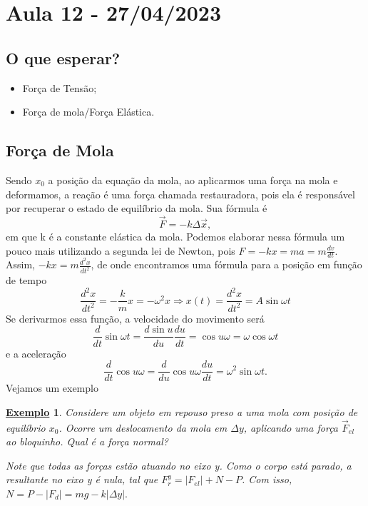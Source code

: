 \documentclass{article}
\newtheorem{example}{\underline{Exemplo}}
\begin{document}
\newpage

\section{Aula 12 - 27/04/2023}
\subsection{O que esperar?} 
\begin{itemize}
  \item For\c ca de Tens\~ao;
  \item For\c ca de mola/For\c ca El\'astica.
\end{itemize}
\subsection{For\c ca de Mola}
  Sendo $x_{0}$ a posi\c c\~ao da equa\c c\~ao da mola, ao aplicarmos uma for\c ca na mola e deformamos, a rea\c c\~ao
  \'e uma for\c ca chamada restauradora, pois ela \'e respons\'avel por recuperar o estado de equil\'ibrio da mola. Sua f\'ormula \'e 
    $$
      \vec{F} = -k\Delta \vec{x},
    $$
    em que k \'e a constante el\'astica da mola. Podemos elaborar nessa f\'ormula um pouco mais utilizando a segunda lei de Newton, pois
    $F = -kx = ma = m \frac{dv}{dt}.$ Assim, $-kx = m \frac{d^{2}x}{dt^{2}}$, de onde encontramos uma f\'ormula para a posi\c c\~ao em fun\c c\~ao de tempo 
      $$
      \frac{d^{2}x}{dt^{2}} = -\frac{k}{m}x = -\omega^{2}x \Rightarrow \boxed{x(t) = \frac{d^{2}x}{dt^{2}} = A\sin{\omega t}}
      $$
      Se derivarmos essa fun\c c\~ao, a velocidade do movimento ser\'a 
        $$
        \frac{d}{dt}\sin{\omega t} = \frac{d\sin{u}}{du}\frac{du}{dt} = \cos{u}\omega = \omega \cos{\omega t}
        $$
      e a acelera\c c\~ao 
      $$
      \frac{d}{dt}\cos{u} \omega = \frac{d}{du}\cos{u}\omega \frac{du}{dt} = \omega^{2}\sin{\omega t}.
      $$
      Vejamos um exemplo
     \begin{example}
        Considere um objeto em repouso preso a uma mola com posi\c c\~ao de equil\'ibrio $x_{0}$. Ocorre um
        deslocamento da mola em $\Delta y$, aplicando uma for\c ca $\vec{F}_{el}$ ao bloquinho. Qual \'e a for\c ca normal?

        Note que todas as for\c cas est\~ao atuando no eixo y. Como o corpo est\'a parado, a resultante no eixo y \'e nula, tal que
      $F_{r}^{y} = |F_{el}| + N - P$. Com isso, $N = P - |F_{d}| = mg - k|\Delta y|.$
     \end{example}
\end{document}
